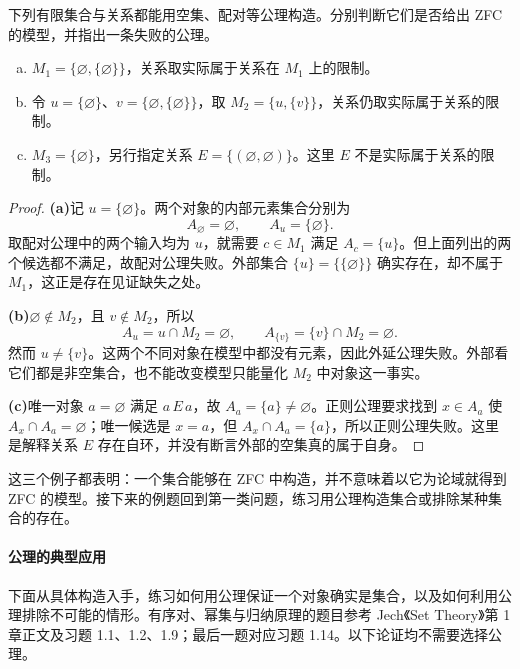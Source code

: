 \documentclass[lang=cn,a4paper,fontset=none,zihao=false,10pt,openany,twoside]{beautybook}
\numberwithin{algorithm}{chapter}
\begin{document}
\begin{example}[寻找失败的公理]\label{ex:zfc-model-check}
下列有限集合与关系都能用空集、配对等公理构造。分别判断它们是否给出 ZFC 的模型，并指出一条失败的公理。
\begin{enumerate}[(a)]
\item $M_1=\{\varnothing,\{\varnothing\}\}$，关系取实际属于关系在 $M_1$ 上的限制。
\item 令 $u=\{\varnothing\}$、$v=\{\varnothing,\{\varnothing\}\}$，取 $M_2=\{u,\{v\}\}$，关系仍取实际属于关系的限制。
\item $M_3=\{\varnothing\}$，另行指定关系 $E=\{(\varnothing,\varnothing)\}$。这里 $E$ 不是实际属于关系的限制。
\end{enumerate}
\end{example}
\begin{proof}
\par\smallskip\noindent\textbf{(a)}\quad 记 $u=\{\varnothing\}$。两个对象的内部元素集合分别为
\[
 A_{\varnothing}=\varnothing,\qquad A_u=\{\varnothing\}.
\]
取配对公理中的两个输入均为 $u$，就需要 $c\in M_1$ 满足 $A_c=\{u\}$。但上面列出的两个候选都不满足，故配对公理失败。外部集合 $\{u\}=\{\{\varnothing\}\}$ 确实存在，却不属于 $M_1$，这正是存在见证缺失之处。

\par\smallskip\noindent\textbf{(b)}\quad $\varnothing\notin M_2$，且 $v\notin M_2$，所以
\[
 A_u=u\cap M_2=\varnothing,
 \qquad A_{\{v\}}=\{v\}\cap M_2=\varnothing.
\]
然而 $u\ne\{v\}$。这两个不同对象在模型中都没有元素，因此外延公理失败。外部看它们都是非空集合，也不能改变模型只能量化 $M_2$ 中对象这一事实。

\par\smallskip\noindent\textbf{(c)}\quad 唯一对象 $a=\varnothing$ 满足 $a\,E\,a$，故 $A_a=\{a\}\ne\varnothing$。正则公理要求找到 $x\in A_a$ 使 $A_x\cap A_a=\varnothing$；唯一候选是 $x=a$，但 $A_x\cap A_a=\{a\}$，所以正则公理失败。这里是解释关系 $E$ 存在自环，并没有断言外部的空集真的属于自身。
\end{proof}

这三个例子都表明：一个集合能够在 ZFC 中构造，并不意味着以它为论域就得到 ZFC 的模型。接下来的例题回到第一类问题，练习用公理构造集合或排除某种集合的存在。

\paragraph{公理的典型应用}
下面从具体构造入手，练习如何用公理保证一个对象确实是集合，以及如何利用公理排除不可能的情形。有序对、幂集与归纳原理的题目参考 Jech《Set Theory》第 1 章正文及习题 1.1、1.2、1.9；最后一题对应习题 1.14。以下论证均不需要选择公理。
\end{document}
